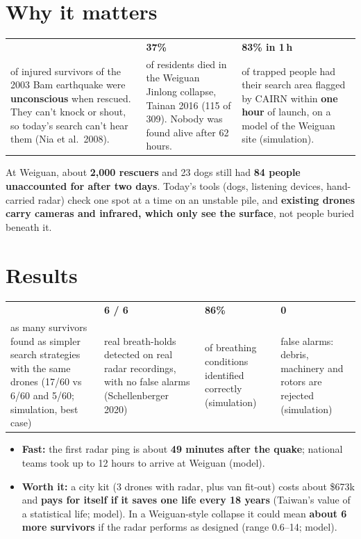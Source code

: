 \documentclass[10pt,a4paper]{extarticle}
\newcommand{\stat}[1]{{\Large\bfseries\color{cairnred}#1}}
\begin{document}
\section*{Why it matters}
\begin{tabularx}{\linewidth}{@{}>{\raggedright\arraybackslash}X>{\raggedright\arraybackslash}X>{\raggedright\arraybackslash}X@{}}
\stat{28\%} & \stat{37\%} & \stat{83\% in 1\,h} \\
of injured survivors of the 2003 Bam earthquake were \textbf{unconscious} when rescued. They can't knock or shout, so today's search can't hear them (Nia et al.\ 2008). &
of residents died in the Weiguan Jinlong collapse, Tainan 2016 (115 of 309). Nobody was found alive after 62 hours. &
of trapped people had their search area flagged by CAIRN within \textbf{one hour} of launch, on a model of the Weiguan site (simulation). \\
\end{tabularx}

At Weiguan, about \textbf{2,000 rescuers} and 23 dogs still had \textbf{84 people unaccounted for after two days}. Today's tools (dogs, listening devices, hand-carried radar) check one spot at a time on an unstable pile, and \textbf{existing drones carry cameras and infrared, which only see the surface}, not people buried beneath it.

\section*{Results}
\begin{tabularx}{\linewidth}{@{}>{\raggedright\arraybackslash}X>{\raggedright\arraybackslash}X>{\raggedright\arraybackslash}X>{\raggedright\arraybackslash}X@{}}
\stat{3$\times$} & \stat{6 / 6} & \stat{86\%} & \stat{0} \\
as many survivors found as simpler search strategies with the same drones (17/60 vs 6/60 and 5/60; simulation, best case) &
real breath-holds detected on real radar recordings, with no false alarms (Schellenberger 2020) &
of breathing conditions identified correctly (simulation) &
false alarms: debris, machinery and rotors are rejected (simulation) \\
\end{tabularx}

\begin{itemize}
  \item \textbf{Fast:} the first radar ping is about \textbf{49 minutes after the quake}; national teams took up to 12 hours to arrive at Weiguan (model).
  \item \textbf{Worth it:} a city kit (3 drones with radar, plus van fit-out) costs about \$673k and \textbf{pays for itself if it saves one life every 18 years} (Taiwan's value of a statistical life; model). In a Weiguan-style collapse it could mean \textbf{about 6 more survivors} if the radar performs as designed (range 0.6--14; model).
\end{itemize}
\end{document}
